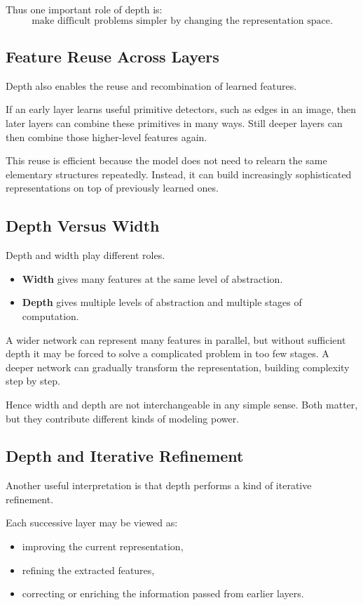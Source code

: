 Thus one important role of depth is:
\[
\text{make difficult problems simpler by changing the representation space.}
\]

\subsection{Feature Reuse Across Layers}

Depth also enables the reuse and recombination of learned features.

If an early layer learns useful primitive detectors, such as edges in an image, then later layers can combine these primitives in many ways. Still deeper layers can then combine those higher-level features again.

This reuse is efficient because the model does not need to relearn the same elementary structures repeatedly. Instead, it can build increasingly sophisticated representations on top of previously learned ones.

\subsection{Depth Versus Width}

Depth and width play different roles.

\begin{itemize}
    \item \textbf{Width} gives many features at the same level of abstraction.
    \item \textbf{Depth} gives multiple levels of abstraction and multiple stages of computation.
\end{itemize}

A wider network can represent many features in parallel, but without sufficient depth it may be forced to solve a complicated problem in too few stages. A deeper network can gradually transform the representation, building complexity step by step.

Hence width and depth are not interchangeable in any simple sense. Both matter, but they contribute different kinds of modeling power.

\subsection{Depth and Iterative Refinement}

Another useful interpretation is that depth performs a kind of iterative refinement.

Each successive layer may be viewed as:
\begin{itemize}
    \item improving the current representation,
    \item refining the extracted features,
    \item correcting or enriching the information passed from earlier layers.
\end{itemize}

